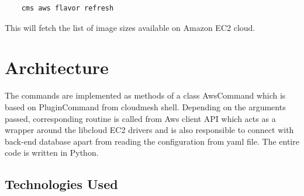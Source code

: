 \documentclass[9pt,twocolumn,twoside]{../../styles/osajnl}
\begin{document}
\begin{verbatim}
    cms aws flavor refresh
\end{verbatim}

This will fetch the list of image sizes available on Amazon EC2 cloud.

\section{Architecture}

The commands are implemented as methods of a class AwsCommand which is
based on PluginCommand from cloudmesh shell. Depending on the
arguments passed, corresponding routine is called from Aws client API
which acts as a wrapper around the libcloud EC2 drivers
\cite{www-libcloud-ec2} and is also responsible to connect with
back-end database apart from reading the configuration from yaml
file. The entire code is written in Python.

\subsection{Technologies Used}
\end{document}
